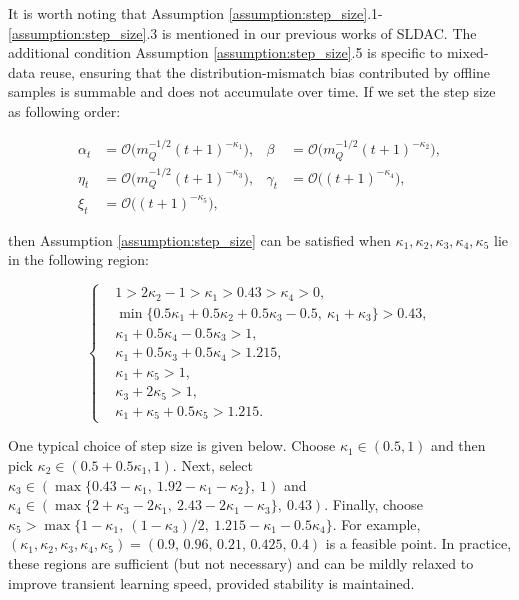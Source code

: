 \documentclass{IEEEtran}
\begin{document}
It is worth noting that Assumption \ref{assumption:step_size}.1- \ref{assumption:step_size}.3 is mentioned in our previous works of SLDAC. The additional condition Assumption \ref{assumption:step_size}.5 is specific to mixed-data reuse, ensuring that the distribution-mismatch bias contributed by offline samples is summable and does not accumulate over time. If we set the step size as following order:

\begin{align}
\alpha_{t} & =\mathcal{O}\!\big(m_{Q}^{-1/2}(t+1)^{-\kappa_{1}}\big), & \beta & =\mathcal{O}\!\big(m_{Q}^{-1/2}(t+1)^{-\kappa_{2}}\big),\nonumber \\
\eta_{t} & =\mathcal{O}\!\big(m_{Q}^{-1/2}(t+1)^{-\kappa_{3}}\big), & \gamma_{t} & =\mathcal{O}\!\big((t+1)^{-\kappa_{4}}\big),\nonumber \\
\xi_{t} & =\mathcal{O}\!\big((t+1)^{-\kappa_{5}}\big),\label{eq:poly_stepsize}
\end{align}

then Assumption \ref{assumption:step_size} can be satisfied when $\kappa_{1},\kappa_{2},\kappa_{3},\kappa_{4},\kappa_{5}$ lie in the following region:

\begin{equation}
\left\{ \begin{aligned} & 1>2\kappa_{2}-1>\kappa_{1}>0.43>\kappa_{4}>0,\\
& \min\{0.5\kappa_{1}+0.5\kappa_{2}+0.5\kappa_{3}-0.5,\ \kappa_{1}+\kappa_{3}\}>0.43,\\ & \kappa_{1}+0.5\kappa_{4}-0.5\kappa_{3}>1,\\ & \kappa_{1}+0.5\kappa_{3}+0.5\kappa_{4}>1.215,\\ & \kappa_{1}+\kappa_{5}>1,\\ & \kappa_{3}+2\kappa_{5}>1,\\ & \kappa_{1}+\kappa_{5}+0.5\kappa_{5}>1.215.
\end{aligned}
\right.\label{eq:kappa_region_core}
\end{equation}

One typical choice of step size is given below. Choose $\kappa_{1}\in(0.5,1)$ and then pick $\kappa_{2}\in(0.5+0.5\kappa_{1},1)$. Next, select $\kappa_{3}\in(\max\{0.43-\kappa_{1},\ 1.92-\kappa_{1}-\kappa_{2}\},\ 1)$ and $\kappa_{4}\in(\max\{2+\kappa_{3}-2\kappa_{1},\ 2.43-2\kappa_{1}-\kappa_{3}\},\ 0.43)$. Finally, choose $\kappa_{5}>\max\{1-\kappa_{1},\ (1-\kappa_{3})/2,\ 1.215-\kappa_{1}-0.5\kappa_{4}\}$. For example, $\left(\kappa_{1},\kappa_{2},\kappa_{3},\kappa_{4},\kappa_{5}\right)=(0.9,\,0.96,\,0.21,\,0.425,\,0.4)$ is a feasible point. In practice, these regions are sufficient (but not necessary) and can be mildly relaxed to improve transient learning speed, provided stability is maintained.
\end{document}

